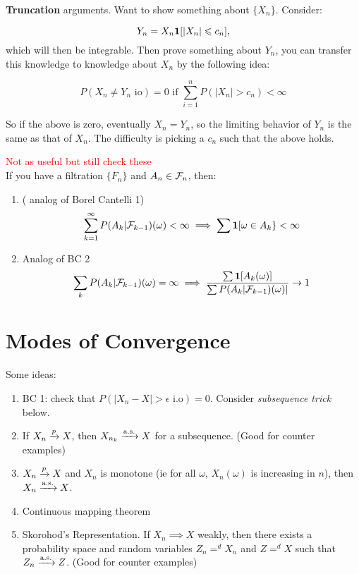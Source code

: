 \documentclass{article}
\newcommand\myworries[1]{\textcolor{red}{#1}}
\begin{document}
\textbf{Truncation} arguments. Want to show something about $\{X_n\}$. Consider:

$$Y_n = X_n \boldsymbol{1}[|X_n| \leqslant c_n],$$
which will then be integrable. Then prove something about $Y_n$, you can transfer this knowledge to knowledge about $X_n$ by the following idea:

$$P(X_n \neq Y_n \text{ io}) =0 \text { if } \sum_{i=1}^n P(|X_n| >c_n) <\infty$$ 

So if the above is zero, eventually $X_n = Y_n$, so the limiting behavior of $Y_n$ is the same as that of $X_n$. The difficulty is picking a $c_n$ such that the above holds. 

\begin{theorem}
\myworries{Not as useful but still check these}\\
If you have a filtration $\{F_n\}$ and $A_n \in \mathcal F_n$, then:
\begin{enumerate}
	\item ( analog of Borel Cantelli 1)
	$$\sum_{k=1}^\infty P(A_k | \mathcal F_{k-1} )(\omega) <\infty \implies \sum \boldsymbol{1}[\omega \in A_k\} <\infty$$ 
	\item Analog of BC 2
	$$\sum_k P(A_k|\mathcal F_{k-1} )(\omega) = \infty \implies \frac{\sum \boldsymbol{1}[A_k (\omega)]}{\sum P(A_k |\mathcal F_{k-1})(\omega)|} \to 1$$
\end{enumerate}

\end{theorem}

\section{Modes of Convergence}
\begin{recipe}

Some ideas:
\begin{enumerate}
	\item BC 1: check that $P(|X_n - X| > \epsilon \text{ i.o} ) = 0$. Consider \textit{subsequence trick} below. 
	\item If $X_n \xrightarrow{p} X$, then $X_{n_k} \xrightarrow{\mathrm{a.s.}} X$ for a subsequence. (Good for counter examples) 
	\item $X_n\xrightarrow{p} X$ and $X_n$ is monotone (ie for all $\omega$, $X_n(\omega)$ is increasing in $n$), then $X_n \xrightarrow{\mathrm{a.s.}} X$.
	\item Continuous mapping theorem 
	\item Skorohod's Representation. If $X_n \implies X$ weakly, then there exists a probability space and random variables $Z_n =^d X_n$ and $Z=^d X$ such that $Z_n \xrightarrow{\mathrm{a.s.}} Z$. (Good for counter examples) 
\end{enumerate}
\end{recipe}
\end{document}
